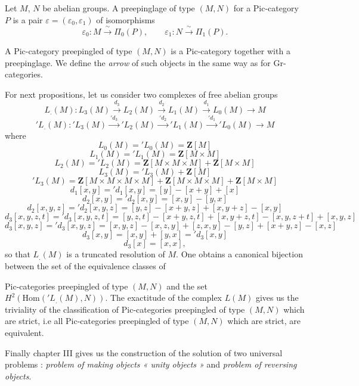 \documentclass[11pt,a4paper]{article}
\begin{document}
Let $M$, $N$ be abelian groups. A preepinglage of type $(M,N)$ for a
Pic-category $P$ is a pair $\varepsilon = (\varepsilon_{0},
\varepsilon_{1})$ of isomorphisms
\[
\varepsilon_{0} : M \xrightarrow{\ \sim\ } \Pi_{0}(P), \qquad
\varepsilon_{1} : N \xrightarrow{\ \sim\ } \Pi_{1}(P).
\]

A Pic-category preepingled of type $(M,N)$ is a Pic-category together
with a preepinglage. We define the \emph{arrow} of such objects in the
same way as for Gr-categories.

For next propositions, let us consider two complexes of free abelian
groups
\[
L_{.}(M) : L_{3}(M) \xrightarrow{\ d_{3}\ } L_{2}(M)
\xrightarrow{\ d_{2}\ } L_{1}(M) \xrightarrow{\ d_{1}\ } L_{0}(M)
\longrightarrow M
\]
\[
{}'L_{.}(M) : {}'L_{3}(M) \xrightarrow{\ 'd_{3}\ } {}'L_{2}(M)
\xrightarrow{\ 'd_{2}\ } {}'L_{1}(M) \xrightarrow{\ 'd_{1}\ } {}'L_{0}(M)
\longrightarrow M
\]
where
\[
L_{0}(M) = {}'L_{0}(M) = \mathbf{Z}[M]
\]
\[
L_{1}(M) = {}'L_{1}(M) = \mathbf{Z}[M \times M]
\]
\[
L_{2}(M) = {}'L_{2}(M) = \mathbf{Z}[M \times M \times M] +
\mathbf{Z}[M \times M]
\]
\[
L_{3}(M) = {}'L_{3}(M) + \mathbf{Z}[M]
\]
\[
{}'L_{3}(M) = \mathbf{Z}[M \times M \times M \times M] +
\mathbf{Z}[M \times M \times M] + \mathbf{Z}[M \times M]
\]
\[
d_{1}[x,y] = {}'d_{1}[x,y] = [y] - [x+y] + [x]
\]
\[
d_{2}[x,y] = {}'d_{2}[x,y] = [x,y] - [y,x]
\]
\[
d_{2}[x,y,z] = {}'d_{2}[x,y,z] = [y,z] - [x+y,z] + [x,y+z] - [x,y]
\]
\[
d_{3}[x,y,z,t] = {}'d_{3}[x,y,z,t] = [y,z,t] - [x+y,z,t] + [x,y+z,t] -
[x,y,z+t] + [x,y,z]
\]
\[
d_{3}[x,y,z] = {}'d_{3}[x,y,z] = [x,y,z] - [x,z,y] + [z,x,y] - [y,z] +
[x+y,z] - [x,z]
\]
\[
d_{3}[x,y] = [x,y] + [y,x] = {}'d_{3}[x,y]
\]
\[
d_{3}[x] = [x,x],
\]
so that $L_{.}(M)$ is a truncated resolution of $M$. One obtains a
canonical bijection between the set of the equivalence classes of

Pic-categories preepingled of type $(M,N)$ and the set
$H^{2}(\mathrm{Hom}({}'L_{.}(M), N))$. The exactitude of the complex
$L(M)$ gives us the triviality of the classification of Pic-categories
preepingled of type $(M,N)$ which are strict, i.e all Pic-categories
preepingled of type $(M,N)$ which are strict, are equivalent.

Finally chapter III gives us the construction of the solution of two
universal problems : \emph{problem of making objects « unity objects »}
and \emph{problem of reversing objects}.
\end{document}
